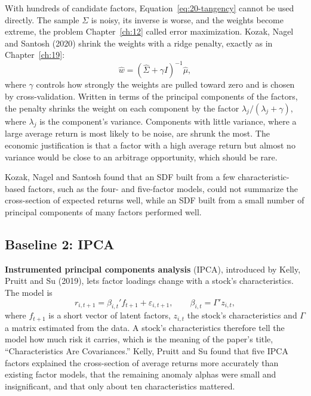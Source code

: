 With hundreds of candidate factors, Equation~\eqref{eq:20-tangency} cannot be used directly. The sample $\Sigma$ is noisy, its inverse is worse, and the weights become extreme, the problem Chapter~\ref{ch:12} called error maximization. Kozak, Nagel and Santosh (2020) shrink the weights with a ridge penalty, exactly as in Chapter~\ref{ch:19}:
\begin{equation}
  \hat w = \left(\hat\Sigma + \gamma I\right)^{-1} \hat\mu,
  \label{eq:20-kns}
\end{equation}
where $\gamma$ controls how strongly the weights are pulled toward zero and is chosen by cross-validation. Written in terms of the principal components of the factors, the penalty shrinks the weight on each component by the factor $\lambda_j/(\lambda_j+\gamma)$, where $\lambda_j$ is the component's variance. Components with little variance, where a large average return is most likely to be noise, are shrunk the most. The economic justification is that a factor with a high average return but almost no variance would be close to an arbitrage opportunity, which should be rare.

Kozak, Nagel and Santosh found that an SDF built from a few characteristic-based factors, such as the four- and five-factor models, could not summarize the cross-section of expected returns well, while an SDF built from a small number of principal components of many factors performed well.

\subsection{Baseline 2: IPCA}

\textbf{Instrumented principal components analysis} (IPCA), introduced by Kelly, Pruitt and Su (2019), lets factor loadings change with a stock's characteristics. The model is
\begin{equation}
  r_{i,t+1} = \beta_{i,t}' f_{t+1} + \varepsilon_{i,t+1}, \qquad \beta_{i,t} = \Gamma' z_{i,t},
  \label{eq:20-ipca}
\end{equation}
where $f_{t+1}$ is a short vector of latent factors, $z_{i,t}$ the stock's characteristics and $\Gamma$ a matrix estimated from the data. A stock's characteristics therefore tell the model how much risk it carries, which is the meaning of the paper's title, ``Characteristics Are Covariances.'' Kelly, Pruitt and Su found that five IPCA factors explained the cross-section of average returns more accurately than existing factor models, that the remaining anomaly alphas were small and insignificant, and that only about ten characteristics mattered.

